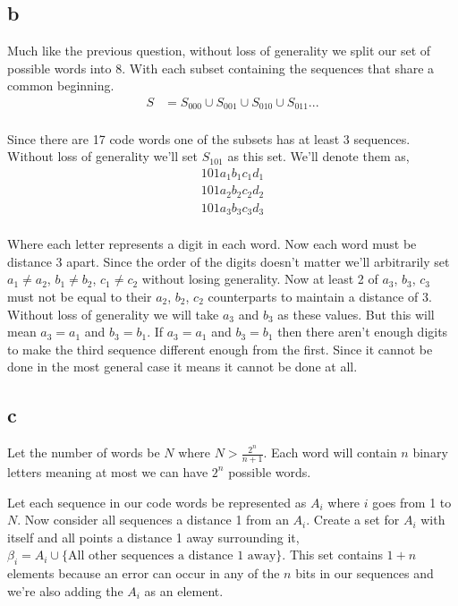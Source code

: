 \documentclass{article}
\begin{document}
\subsection{b}
Much like the previous question,
without loss of generality we split our set of possible words into 8. With
each subset containing the sequences that share a common beginning.
\begin{align*}
    S &= S_{000} \cup S_{001} \cup S_{010} \cup S_{011} ... \\
\end{align*}

Since there are 17 code words one of the subsets has at least 3 sequences.
Without loss of generality we'll set $S_{101}$ as this set.
We'll denote them as,
\begin{align*}
    1 0 1 a_1 b_1 c_1 d_1 \\
    1 0 1 a_2 b_2 c_2 d_2 \\
    1 0 1 a_3 b_3 c_3 d_3 \\
\end{align*}

Where each letter represents a digit in each word. Now each word must be
distance 3 apart. Since the order of the digits doesn't matter we'll
arbitrarily set $a_1 \neq a_2$, $b_1 \neq b_2$, $c_1 \neq c_2$ without losing
generality. Now at least 2 of $a_3$, $b_3$, $c_3$ must not be equal to their
$a_2$, $b_2$, $c_2$ counterparts to maintain a distance of 3. Without loss of
generality we will take $a_3$ and $b_3$ as these values. But this will mean
$a_3 = a_1$ and $b_3 = b_1$. If $a_3 = a_1$ and $b_3 = b_1$ then there aren't
enough digits to make the third sequence different enough from the first.
Since it cannot be done in the most general case it means it cannot be done
at all.

\subsection{c}
Let the number of words be $N$ where $N > \frac{2^n}{n+1}$. Each word will
contain $n$ binary letters meaning at most we can have $2^n$ possible words.

Let each sequence in our code words be represented as $A_i$ where $i$ goes from
1 to $N$. Now consider all sequences a distance 1 from an $A_i$. Create a set
for $A_i$ with itself and all points a distance 1 away surrounding it,
$\beta_i = A_i \cup \{\text{All other sequences a distance 1 away}\}$. This
set contains $1 + n$ elements because an error can occur in any of the $n$ bits
in our sequences and we're also adding the $A_i$ as an element.
\end{document}
